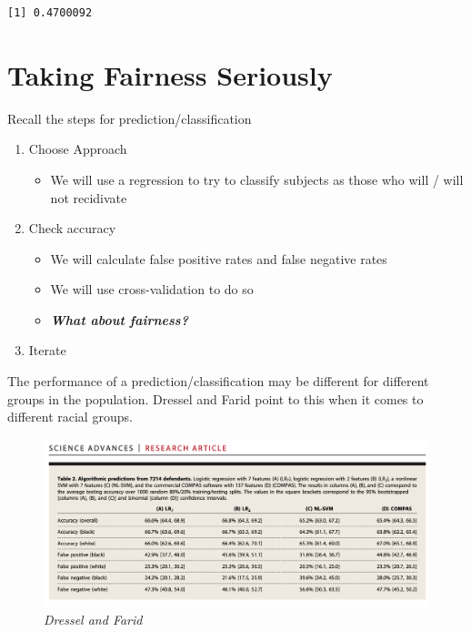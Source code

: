 \documentclass[
  letterpaper,
  DIV=11,
  numbers=noendperiod]{scrreprt}
\providecommand{\tightlist}{%
  \setlength{\itemsep}{0pt}\setlength{\parskip}{0pt}}\usepackage{longtable,booktabs,array}
\begin{document}
\begin{verbatim}
[1] 0.4700092
\end{verbatim}

\hypertarget{taking-fairness-seriously}{%
\section{Taking Fairness Seriously}\label{taking-fairness-seriously}}

Recall the steps for prediction/classification

\begin{enumerate}
\def\labelenumi{\arabic{enumi}.}
\tightlist
\item
  Choose Approach

  \begin{itemize}
  \tightlist
  \item
    We will use a regression to try to classify subjects as those who
    will / will not recidivate
  \end{itemize}
\item
  Check accuracy

  \begin{itemize}
  \tightlist
  \item
    We will calculate false positive rates and false negative rates
  \item
    We will use cross-validation to do so
  \item
    \textbf{\emph{What about fairness?}}
  \end{itemize}
\item
  Iterate
\end{enumerate}

The performance of a prediction/classification may be different for
different groups in the population. Dressel and Farid point to this when
it comes to different racial groups.

\begin{figure}

{\centering \includegraphics{images/fair1.png}

}

\caption{\emph{Dressel and Farid}}

\end{figure}
\end{document}

